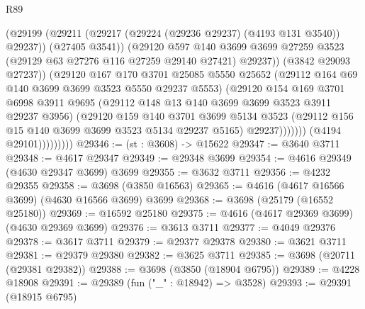 \begin{lexlean}{R89}
\begin{coremodule}
                                (@29199
                                  (@29211
                                    (@29217 (@29224 (@29236 @29237) (@4193 @131 @3540)) @29237))
                                  (@27405 @3541))
                                (@29120
                                  @597
                                  @140
                                  @3699
                                  @3699
                                  @27259
                                  @3523
                                  (@29129 @63 @27276 @116 @27259 @29140 @27421)
                                  @29237))
                              (@3842 @29093 @27237))
                            (@29120
                              @167
                              @170
                              @3701
                              @25085
                              @5550
                              @25652
                              (@29112 @164 @69 @140 @3699 @3699 @3523 @5550 @29237 @5553)
                              (@29120
                                @154
                                @169
                                @3701
                                @6998
                                @3911
                                @9695
                                (@29112 @148 @13 @140 @3699 @3699 @3523 @3911 @29237 @3956)
                                (@29120
                                  @159
                                  @140
                                  @3701
                                  @3699
                                  @5134
                                  @3523
                                  (@29112 @156 @15 @140 @3699 @3699 @3523 @5134 @29237 @5165)
                                  @29237)))))))
                    (@4194 @29101)))))))))
@29346 := (st : @3608) -> @15622
@29347 := @3640 @3711
@29348 := @4617 @29347
@29349 := @29348 @3699
@29354 := @4616 @29349 (@4630 @29347 @3699) @3699
@29355 := @3632 @3711
@29356 := @4232 @29355
@29358 := @3698 (@3850 @16563)
@29365 := @4616 (@4617 @16566 @3699) (@4630 @16566 @3699) @3699
@29368 := @3698 (@25179 (@16552 @25180))
@29369 := @16592 @25180
@29375 := @4616 (@4617 @29369 @3699) (@4630 @29369 @3699)
@29376 := @3613 @3711
@29377 := @4049 @29376
@29378 := @3617 @3711
@29379 := @29377 @29378
@29380 := @3621 @3711
@29381 := @29379 @29380
@29382 := @3625 @3711
@29385 := @3698 (@20711 (@29381 @29382))
@29388 := @3698 (@3850 (@18904 @6795))
@29389 := @4228 @18908
@29391 := @29389 (fun ("_" : @18942) => @3528)
@29393 := @29391 (@18915 @6795)

\end{coremodule}
\end{lexlean}
